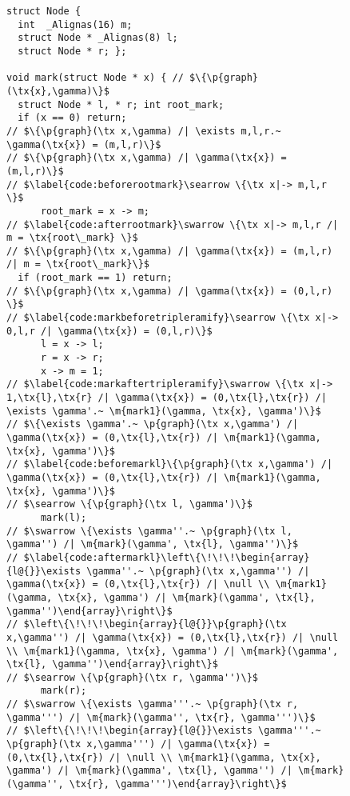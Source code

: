 \begin{figure}[t]
  \begin{lstlisting}
struct Node {
  int  _Alignas(16) m;
  struct Node * _Alignas(8) l;
  struct Node * r; };

void mark(struct Node * x) { // $\{\p{graph}(\tx{x},\gamma)\}$
  struct Node * l, * r; int root_mark;
  if (x == 0) return;
// $\{\p{graph}(\tx x,\gamma) /| \exists m,l,r.~ \gamma(\tx{x}) = (m,l,r)\}$
// $\{\p{graph}(\tx x,\gamma) /| \gamma(\tx{x}) = (m,l,r)\}$
// $\label{code:beforerootmark}\searrow \{\tx x|-> m,l,r \}$
      root_mark = x -> m;
// $\label{code:afterrootmark}\swarrow \{\tx x|-> m,l,r /| m = \tx{root\_mark} \}$
// $\{\p{graph}(\tx x,\gamma) /| \gamma(\tx{x}) = (m,l,r) /| m = \tx{root\_mark}\}$
  if (root_mark == 1) return;
// $\{\p{graph}(\tx x,\gamma) /| \gamma(\tx{x}) = (0,l,r) \}$
// $\label{code:markbeforetripleramify}\searrow \{\tx x|-> 0,l,r /| \gamma(\tx{x}) = (0,l,r)\}$
      l = x -> l;
      r = x -> r;
      x -> m = 1;
// $\label{code:markaftertripleramify}\swarrow \{\tx x|-> 1,\tx{l},\tx{r} /| \gamma(\tx{x}) = (0,\tx{l},\tx{r}) /| \exists \gamma'.~ \m{mark1}(\gamma, \tx{x}, \gamma')\}$
// $\{\exists \gamma'.~ \p{graph}(\tx x,\gamma') /| \gamma(\tx{x}) = (0,\tx{l},\tx{r}) /| \m{mark1}(\gamma, \tx{x}, \gamma')\}$
// $\label{code:beforemarkl}\{\p{graph}(\tx x,\gamma') /| \gamma(\tx{x}) = (0,\tx{l},\tx{r}) /| \m{mark1}(\gamma, \tx{x}, \gamma')\}$
// $\searrow \{\p{graph}(\tx l, \gamma')\}$
      mark(l);
// $\swarrow \{\exists \gamma''.~ \p{graph}(\tx l, \gamma'') /| \m{mark}(\gamma', \tx{l}, \gamma'')\}$
// $\label{code:aftermarkl}\left\{\!\!\!\begin{array}{l@{}}\exists \gamma''.~ \p{graph}(\tx x,\gamma'') /| \gamma(\tx{x}) = (0,\tx{l},\tx{r}) /| \null \\ \m{mark1}(\gamma, \tx{x}, \gamma') /| \m{mark}(\gamma', \tx{l}, \gamma'')\end{array}\right\}$
// $\left\{\!\!\!\begin{array}{l@{}}\p{graph}(\tx x,\gamma'') /| \gamma(\tx{x}) = (0,\tx{l},\tx{r}) /| \null \\ \m{mark1}(\gamma, \tx{x}, \gamma') /| \m{mark}(\gamma', \tx{l}, \gamma'')\end{array}\right\}$
// $\searrow \{\p{graph}(\tx r, \gamma'')\}$
      mark(r);
// $\swarrow \{\exists \gamma'''.~ \p{graph}(\tx r, \gamma''') /| \m{mark}(\gamma'', \tx{r}, \gamma''')\}$
// $\left\{\!\!\!\begin{array}{l@{}}\exists \gamma'''.~ \p{graph}(\tx x,\gamma''') /| \gamma(\tx{x}) = (0,\tx{l},\tx{r}) /| \null \\ \m{mark1}(\gamma, \tx{x}, \gamma') /| \m{mark}(\gamma', \tx{l}, \gamma'') /| \m{mark}(\gamma'', \tx{r}, \gamma''')\end{array}\right\}$

\end{lstlisting}
\end{figure}
